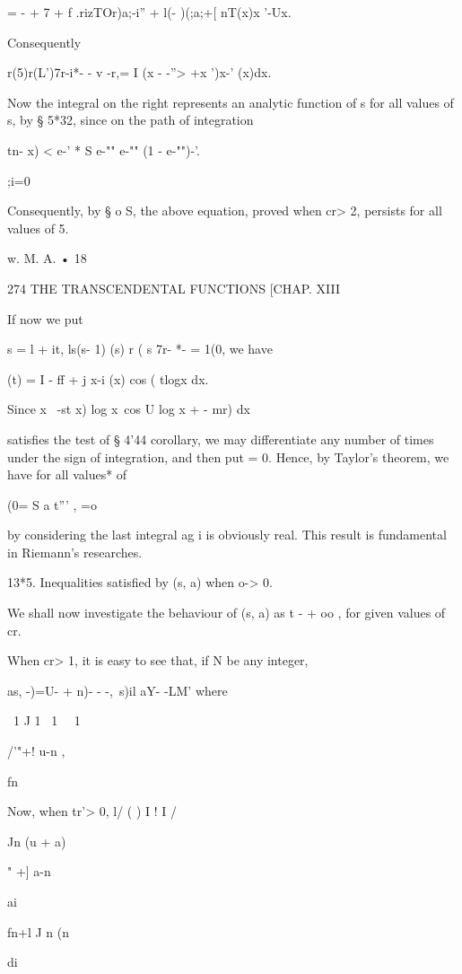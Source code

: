 = - + 7 + f .rizTOr)a;-i'' + l(- )(;a;+[ nT(x)x '-Ux.

Consequently

r(5)r(L')7r-i*- - v -r,= I (x - -''> +x ')x-' (x)dx.

Now the integral on the right represents an analytic function of s for
all values of s, by § 5*32, since on the path of integration

tn- x) < e-' * S e-"" e-"" (1 - e-"")-'.

;i=0

Consequently, by § o S, the above equation, proved when cr> 2,
persists for all values of 5.

w. M. A. • 18



274 THE TRANSCENDENTAL FUNCTIONS [CHAP. XIII

If now we put

s = l + it, ls(s- 1) (s) r ( s 7r- *- = 1(0, we have

  (t) = I - ff + j x-i (x) cos ( tlogx dx.

Since x~ -st x) log x\ cos U log x + - mr) dx

satisfies the test of § 4'44 corollary, we may differentiate any
number of times under the sign of integration, and then put = 0.
Hence, by Taylor's theorem, we have for all values* of

 (0= S a t''' , =o

by considering the last integral ag i is obviously real. This result
is fundamental in Riemann's researches.

13*5. Inequalities satisfied by (s, a) when o-> 0.

We shall now investigate the behaviour of (s, a) as t - + oo , for
given values of cr.

When cr> 1, it is easy to see that, if N be any integer,

as, -)=U- + n)- - -,\ s)il aY- -LM' where

\ 1 J 1 \ 1 \ \ 1

/'"+! u-n ,

fn

Now, when tr'> 0, l/ ( ) I ! I /

Jn (u + a)



" +] a-n

ai



fn+l J n (n



di




